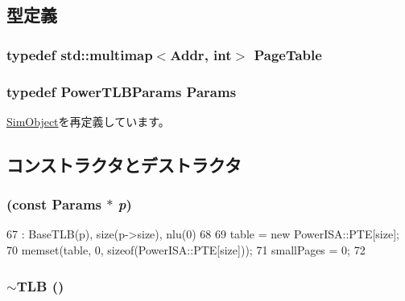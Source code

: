 \subsection{型定義}
\hypertarget{classPowerISA_1_1TLB_a18f97eb978c56b976c0eadbf9212d206}{
\subsubsection[{PageTable}]{\setlength{\rightskip}{0pt plus 5cm}typedef std::multimap$<${\bf Addr}, int$>$ {\bf PageTable}}}
\label{classPowerISA_1_1TLB_a18f97eb978c56b976c0eadbf9212d206}
\hypertarget{classPowerISA_1_1TLB_a483872f6d75119b1124c758297acc6da}{
\subsubsection[{Params}]{\setlength{\rightskip}{0pt plus 5cm}typedef PowerTLBParams {\bf Params}}}
\label{classPowerISA_1_1TLB_a483872f6d75119b1124c758297acc6da}


\hyperlink{classSimObject_a0f0761d2db586a23bb2a2880b8f387bb}{SimObject}を再定義しています。

\subsection{コンストラクタとデストラクタ}
\hypertarget{classPowerISA_1_1TLB_acb886bd3c59f00c21be9ceaaf25dab97}{
\subsubsection[{TLB}]{ (const {\bf Params} $\ast$ {\em p})}}
\label{classPowerISA_1_1TLB_acb886bd3c59f00c21be9ceaaf25dab97}



\begin{DoxyCode}
67     : BaseTLB(p), size(p->size), nlu(0)
68 {
69     table = new PowerISA::PTE[size];
70     memset(table, 0, sizeof(PowerISA::PTE[size]));
71     smallPages = 0;
72 }
\end{DoxyCode}
\hypertarget{classPowerISA_1_1TLB_a18a1722ab7889997b15fd7b9fc33c7ff}{
\subsubsection[{$\sim$TLB}]{\setlength{\rightskip}{0pt plus 5cm}$\sim${\bf TLB} ()}}
\label{classPowerISA_1_1TLB_a18a1722ab7889997b15fd7b9fc33c7ff}



